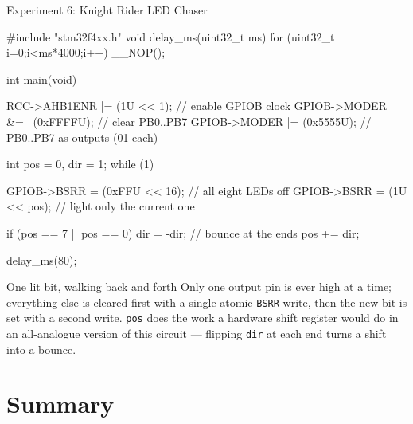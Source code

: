 \documentclass[9pt,aspectratio=169,xcolor=table]{beamer}
\begin{document}
{\beamerextras
\begin{frame}[fragile]{Experiment 6: Knight Rider LED Chaser}
	\begin{cc}[basicstyle=\ttfamily\scriptsize]
		#include "stm32f4xx.h"
		void delay_ms(uint32_t ms) { for (uint32_t i=0;i<ms*4000;i++) __NOP(); }

		int main(void) {
			RCC->AHB1ENR |= (1U << 1);      // enable GPIOB clock
			GPIOB->MODER &= ~(0xFFFFU);     // clear PB0..PB7
			GPIOB->MODER |=  (0x5555U);     // PB0..PB7 as outputs (01 each)

			int pos = 0, dir = 1;
			while (1) {
				GPIOB->BSRR = (0xFFU << 16);   // all eight LEDs off
				GPIOB->BSRR = (1U << pos);     // light only the current one

				if (pos == 7 || pos == 0) dir = -dir;  // bounce at the ends
				pos += dir;

				delay_ms(80);
			}
		}
	\end{cc}

	\vspace{2mm}
	\begin{block}{One lit bit, walking back and forth}
		Only one output pin is ever high at a time; everything else is
		cleared first with a single \alert{atomic} \texttt{BSRR} write,
		then the new bit is set with a second write. \texttt{pos} does
		the work a hardware shift register would do in an all-analogue
		version of this circuit --- flipping \texttt{dir} at each end
		turns a shift into a \alert{bounce}.
	\end{block}
\end{frame}
}


\section{Summary}
\end{document}
